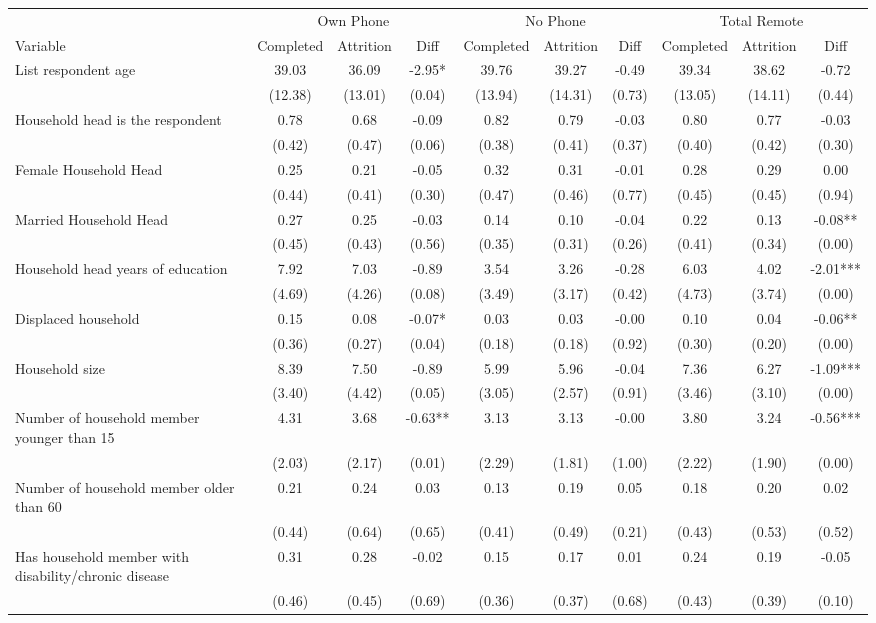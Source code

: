 \begin{tabular}{l*{9}c}
\hline\hline
 & \multicolumn{3}{c}{Own Phone} & \multicolumn{3}{c}{No Phone} & \multicolumn{3}{c}{Total Remote}\\ 
Variable & Completed & Attrition & Diff & Completed & Attrition & Diff & Completed & Attrition & Diff \\
\hline
List respondent age&39.03&36.09&-2.95*&39.76&39.27&-0.49&39.34&38.62&-0.72\\
&(12.38)&(13.01)&(0.04)&(13.94)&(14.31)&(0.73)&(13.05)&(14.11)&(0.44)\\
Household head is the respondent&0.78&0.68&-0.09&0.82&0.79&-0.03&0.80&0.77&-0.03\\
&(0.42)&(0.47)&(0.06)&(0.38)&(0.41)&(0.37)&(0.40)&(0.42)&(0.30)\\
Female Household Head&0.25&0.21&-0.05&0.32&0.31&-0.01&0.28&0.29&0.00\\
&(0.44)&(0.41)&(0.30)&(0.47)&(0.46)&(0.77)&(0.45)&(0.45)&(0.94)\\
Married Household Head&0.27&0.25&-0.03&0.14&0.10&-0.04&0.22&0.13&-0.08**\\
&(0.45)&(0.43)&(0.56)&(0.35)&(0.31)&(0.26)&(0.41)&(0.34)&(0.00)\\
Household head years of education&7.92&7.03&-0.89&3.54&3.26&-0.28&6.03&4.02&-2.01***\\
&(4.69)&(4.26)&(0.08)&(3.49)&(3.17)&(0.42)&(4.73)&(3.74)&(0.00)\\
Displaced household&0.15&0.08&-0.07*&0.03&0.03&-0.00&0.10&0.04&-0.06**\\
&(0.36)&(0.27)&(0.04)&(0.18)&(0.18)&(0.92)&(0.30)&(0.20)&(0.00)\\
Household size&8.39&7.50&-0.89&5.99&5.96&-0.04&7.36&6.27&-1.09***\\
&(3.40)&(4.42)&(0.05)&(3.05)&(2.57)&(0.91)&(3.46)&(3.10)&(0.00)\\
Number of household member younger than 15&4.31&3.68&-0.63**&3.13&3.13&-0.00&3.80&3.24&-0.56***\\
&(2.03)&(2.17)&(0.01)&(2.29)&(1.81)&(1.00)&(2.22)&(1.90)&(0.00)\\
Number of household member older than 60&0.21&0.24&0.03&0.13&0.19&0.05&0.18&0.20&0.02\\
&(0.44)&(0.64)&(0.65)&(0.41)&(0.49)&(0.21)&(0.43)&(0.53)&(0.52)\\
Has household member with disability/chronic disease&0.31&0.28&-0.02&0.15&0.17&0.01&0.24&0.19&-0.05\\
&(0.46)&(0.45)&(0.69)&(0.36)&(0.37)&(0.68)&(0.43)&(0.39)&(0.10)\\

\end{tabular}
